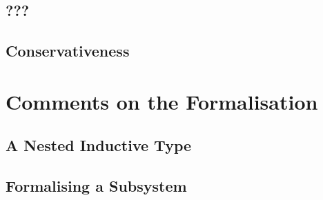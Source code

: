 \subsection{???}

\subsection{Conservativeness}

\section{Comments on the Formalisation}
\subsection{A Nested Inductive Type}
\subsection{Formalising a Subsystem}
